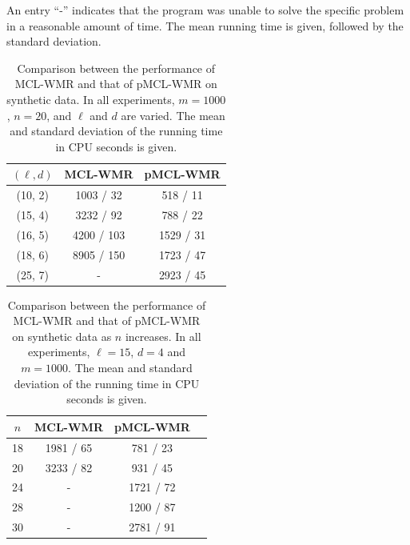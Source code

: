 An entry ``-'' indicates that the program was unable to solve the specific problem in a reasonable amount of time. The mean running time is given, followed by the standard deviation. 

\begin{table}[h]
\begin{center} {
	\begin{tabular}{|c|c|c|}
     \hline	
	$(\ell, d)$	 		& MCL-WMR		& pMCL-WMR	 \\
	\hline
    (10, 2)				& 1003 / 32 		& 518 / 11			\\
    (15, 4)				& 3232 / 92			& 788 / 22			\\
	(16, 5)  			& 4200 / 103		& 1529 / 31				\\
	(18, 6)		 		& 8905 / 150		& 1723 / 47 			\\
	(25, 7)				& -						& 	2923 / 45		\\
	\hline
	\end{tabular}} 
	\end{center}
\caption[Comparison between the performance of MCL-WMR and that of pMCL-WMR on synthetic data. ]{Comparison between the performance of MCL-WMR and that of pMCL-WMR on synthetic data. In all experiments, $m = 1000$, $n = 20$, and $\ell$ and $d$ are varied. The mean and standard deviation of the running time in CPU seconds is given. }
\label{table3}
\end{table}


\begin{table}[h]
\begin{center} {
  \begin{tabular}{|c|c|c|c|}
     \hline	
	$n$				& MCL-WMR 	& pMCL-WMR	 \\
	\hline
    18				& 1981 / 65		& 781 / 23 \\
	20  				& 3233 / 82  	& 931 / 45 \\
	24		  	  	&	-					& 1721	/ 72	\\
	28				&  - 					& 1200	/ 87 \\
	30				&  - 					& 2781	/ 91		 \\
	\hline
	\end{tabular}}
\end{center}
	\caption[Comparison between the performance of MCL-WMR and that of pMCL-WMR on synthetic data as $n$ increases.]{Comparison between the performance of MCL-WMR and that of pMCL-WMR on synthetic data as $n$ increases. In all experiments, $\ell = 15$, $d = 4$ and $m = 1000$. The mean and standard deviation of the running time in CPU seconds is given. } 
	\label{table4}
\end{table}
 	
